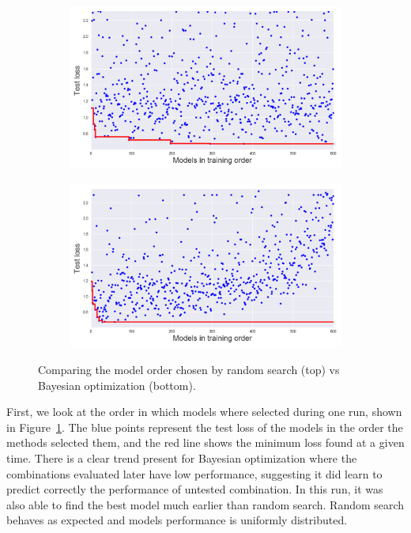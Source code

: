 \begin{figure}[htbp]
	\begin{subfigure}[b]{\textwidth}
            \centering
            \includegraphics[width=\linewidth]{img_hyperopt/cifar_random}
    \end{subfigure}%
    
    \begin{subfigure}[b]{\textwidth}
            \centering
            \includegraphics[width=\linewidth]{img_hyperopt/cifar_bo}
    \end{subfigure}%
    \caption[Comparing random search and Bayesian optimization]{Comparing the model order chosen by random search (top) vs Bayesian optimization (bottom).}
	\label{fig:cifar_loss}
\end{figure}

First, we look at the order in which models where selected during one run, shown in Figure~\ref{fig:cifar_loss}. The blue points represent the test loss of the models in the order the methods selected them, and the red line shows the minimum loss found at a given time. There is a clear trend present for Bayesian optimization where the combinations evaluated later have low performance, suggesting it did learn to predict correctly the performance of untested combination. In this run, it was also able to find the best model much earlier than random search. Random search behaves as expected and models performance is uniformly distributed.

